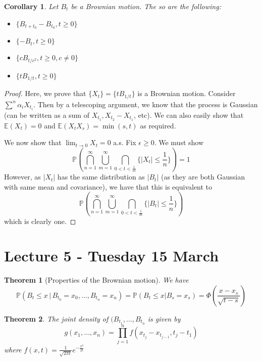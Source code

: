 \documentclass[10pt, oneside, reqno]{amsart}
\theoremstyle{plain}%
\newtheorem{thm}{Theorem}[section]
\newtheorem*{cor}{Corollary}
\theoremstyle{definition}
\theoremstyle{remark}
\renewcommand{\P}{\mathbb{P}}
\newcommand{\E}{\mathbb{E}}
\begin{document}
\begin{cor}
    Let $B_t$ be a Brownian motion.  The so are the following:
    \begin{itemize}
        \item $\{ B_{t + t_0} - B_{t_0}, t \geq 0 \}$
        \item $\{ -B_t, t \geq 0 \}$
        \item $\{ c B_{t/c^2}, t \geq 0, c \neq 0 \}$
        \item $\{ t B_{1/t} , t \geq 0 \}$
    \end{itemize}
\end{cor}

\begin{proof} Here, we prove that $\{ X_t \} = \{ t B_{1/t} \}$ is a Brownian motion.  Consider $\sum^n \alpha_i X_{t_i}$.  Then by a telescoping argument, we know that the process is Gaussian (can be written as a sum of $X_{t_1}, X_{t_2} - X_{t_1}$, etc).  We can also easily show that $\E(X_t) = 0$ and $\E(X_t X_s) = \min(s,t)$ as required.   
    
We now show that $\lim_{t \rightarrow 0} X_t = 0$ a.s. Fix $\epsilon \geq 0$.  We must show \[
    \P \left( \bigcap_{n=1}^\infty \bigcup_{m = 1}^\infty \bigcap_{0 < t < \frac{1}{m}} \{ |X_t | \leq \frac{1}{n} \} \right) = 1
\]
However, as $|X_t|$ has the same distribution as $|B_t|$ (as they are both Gaussian with same mean and covariance), we have that this is equivalent to \[
        \P \left( \bigcap_{n=1}^\infty \bigcup_{m = 1}^\infty \bigcap_{0 < t < \frac{1}{m}} \{ |B_t | \leq \frac{1}{n} \} \right)
\] which is clearly one.

\end{proof}

\section{Lecture 5 - Tuesday 15 March} %
\label{sec:lecture_5_tuesday_15_march}

\begin{thm}[Properties of the Brownian motion]
    We have \[
        \P( B_t \leq x \, | \, B_{t_0} = x_0, \dots, B_{t_n} = x_n ) = \P(B_t \leq x | B_s = x_s) = \Phi( \frac{x - x_s}{\sqrt{t-s}})
    \] 
\end{thm}

\begin{thm}
    The joint density of $(B_{t_1}, \dots, B_{t_n}$ is given by \[
        g(x_1, \dots, x_n) = \prod_{j=1}^n f(x_{t_j} - x_{t_{j-1}}, t_j - t_1)
    \] where $f(x,t) = \frac{1}{\sqrt{2 \pi t}} e^{-\frac{x^2}{2t}}$
\end{thm}
\end{document}
